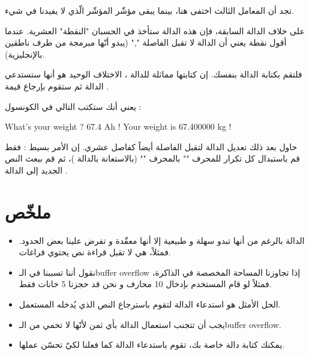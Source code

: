 تجد أن المعامل الثالث
اختفى هنا، بينما يبقى مؤشّر المؤشّر
الّذي لا يفيدنا في شيء.

على خلاف الدالة السابقة، فإن هذه الدالة ستأخذ في الحسبان "النقطة" العشرية. عندما أقول نقطة يعني أن الدالة لا تقبل الفاصلة
"\textenglish{,}"
(يبدو أنّها مبرمجة من طرف ناطقين بالإنجليزية).

فلتقم بكتابة الدالة
بنفسك. إن كتابتها مماثلة للدالة
،
الاختلاف الوحيد هو أنها ستستدعي الدالة
ثم ستقوم بإرجاع قيمة
.

يعني أنك ستكتب التالي في الكونسول :

\begin{Console}
  What's your weight ? 67.4
  Ah ! Your weight is 67.400000 kg !
\end{Console}


حاول بعد ذلك تعديل الدالة
لتقبل الفاصلة أيضاً كفاصل عشري. إن الأمر بسيط : فقط قم باستبدال كل تكرار للمحرف
"\InlineCode{,}"
بالمحرف
""
(بالاستعانة بالدالة
)،
ثم قم ببعث النص الجديد إلى الدالة
.

\section*{ملخّص}

\begin{itemize}
  \item الدالة
بالرغم من أنها تبدو سهلة و طبيعية إلا أنها معقّدة و تفرض علينا بعض الحدود. فمثلاً، هي لا تقبل قراءة نص يحتوي فراغات.
  \item نقول أننا تسببنا في الـ\textenglish{buffer overflow}
إذا تجاوزنا المساحة المخصصة في الذاكرة، فمثلاً لو قام المستخدم بإدخال 10 محارف و نحن قد حجزنا 5 خانات فقط.
  \item الحل الأمثل هو استدعاء الدالة
لتقوم باسترجاع النص الذي يُدخله المستعمل.
  \item يجب أن تتجنب استعمال الدالة
بأي ثمن لأنّها لا تحمي من الـ\textenglish{buffer overflow}.
  \item يمكنك كتابة دالة خاصة بك، تقوم باستدعاء الدالة
كما فعلنا لكيّ تحسّن عملها.
\end{itemize}
